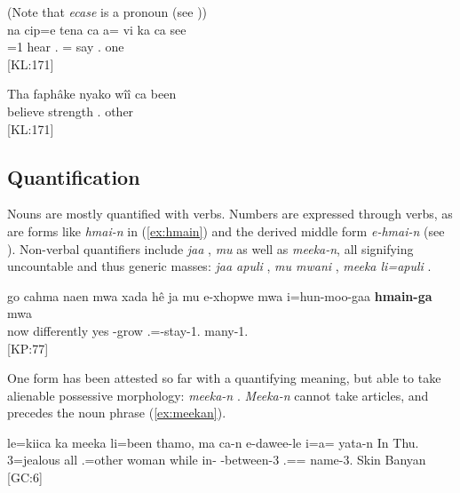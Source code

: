 \ea\label{ex:case}
(Note that \textit{ecase}  is a pronoun (see ))\\
\gll na cip=e tena ca a= vi ka ca see\\
  =1 hear . = say  . one\\
\glt {} {[KL:171]}
\z

\ea
\label{ex:cabeen}
\gll Tha faphâke nyako wîî ca been  \\
  believe  strength . other\\
\glt {} {[KL:171]}
\z

\subsection{Quantification}
\label{ssec:Quant}
\label{ssec:meeka-n}
\begin{sloppypar}
Nouns are mostly quantified with verbs. Numbers are expressed through verbs, as are forms like \textit{hmai-n}  in (\ref{ex:hmain}) and the derived middle form \mbox{\textit{e-hmai-n}}  (see ). Non-verbal quantifiers include \textit{jaa} , \textit{mu}  as well as \textit{meeka-n}, all signifying uncountable and thus generic masses: \textit{jaa apuli} , \textit{mu mwani} , \textit{meeka li=apuli} . 
\end{sloppypar}

\ea \label{ex:hmain}
\gll go cahma naen mwa xada hê ja mu e-xhopwe mwa i=hun-moo-gaa \textbf{hmain-ga} mwa \\
   now  differently yes   -grow  .=-stay-1. many-1. \\
\glt {} {[KP:77]}
\z

One form has been attested so far with a quantifying meaning, but able to take alienable possessive morphology: \textit{meeka-n} . \textit{Meeka-n} cannot take articles, and precedes the noun phrase (\ref{ex:meekan}). 

 \ea \label{ex:meekan}
\gll le=kiica ka meeka li=been thamo, ma ca-n e-dawee-le i=a= yata-n In Thu.\\
 3=jealous  all .=other woman while in- -between-3 .== name-3. Skin Banyan\\
\glt {} {[GC:6]}
\z


